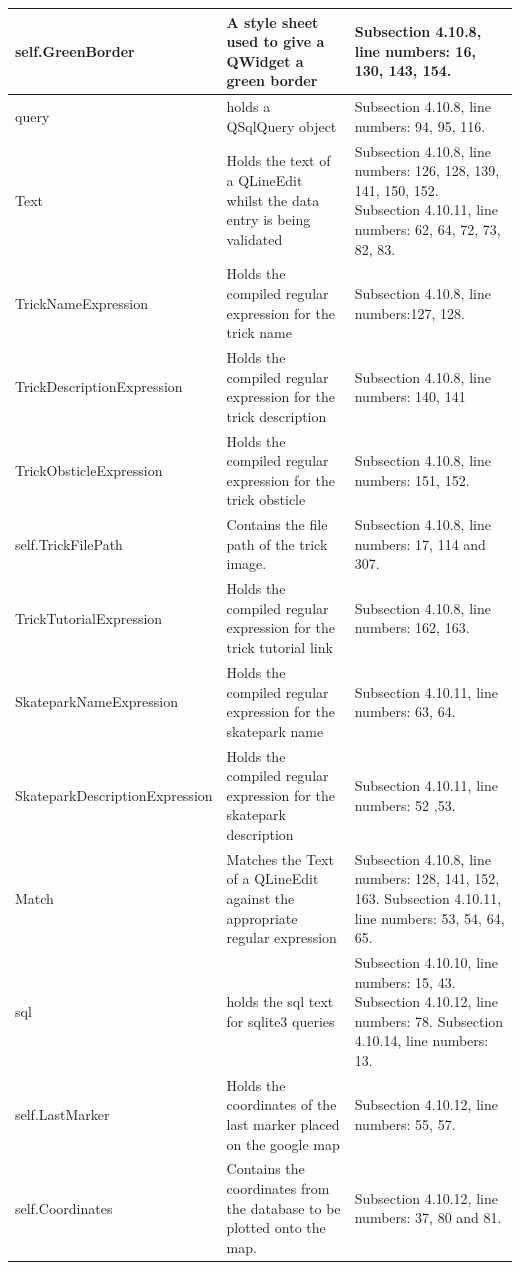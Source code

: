 \begin{center}
\begin{longtable}{|p{5cm}|p{6cm}|p{3.5cm}|}
self.GreenBorder & A style sheet used to give a QWidget a green border & Subsection 4.10.8, line numbers: 16, 130, 143, 154. \\ \hline
query & holds a QSqlQuery object & Subsection 4.10.8, line numbers: 94, 95, 116. \\ \hline
Text & Holds the text of a QLineEdit whilst the data entry is being validated &Subsection 4.10.8, line numbers: 126, 128, 139, 141, 150, 152. Subsection 4.10.11, line numbers: 62, 64, 72, 73, 82, 83. \\ \hline
TrickNameExpression & Holds the compiled regular expression for the trick name & Subsection 4.10.8, line numbers:127, 128. \\ \hline
TrickDescriptionExpression & Holds the compiled regular expression for the trick description & Subsection 4.10.8, line numbers: 140, 141 \\ \hline
TrickObsticleExpression & Holds the compiled regular expression for the trick obsticle &Subsection 4.10.8, line numbers: 151, 152. \\ \hline

self.TrickFilePath & Contains the file path of the trick image. & Subsection 4.10.8, line numbers: 17, 114 and 307. \\ \hline

TrickTutorialExpression & Holds the compiled regular expression for the trick tutorial link & Subsection 4.10.8, line numbers: 162, 163. \\ \hline
SkateparkNameExpression & Holds the compiled regular expression for the skatepark name& Subsection 4.10.11, line numbers: 63, 64. \\ \hline
SkateparkDescriptionExpression & Holds the compiled regular expression for the skatepark description & Subsection 4.10.11, line numbers: 52 ,53. \\ \hline
Match & Matches the Text of a QLineEdit against the appropriate regular expression & Subsection 4.10.8, line numbers: 128, 141, 152, 163. Subsection 4.10.11, line numbers: 53, 54, 64, 65. \\ \hline
sql & holds the sql text for sqlite3 queries & Subsection 4.10.10, line numbers: 15, 43. Subsection 4.10.12, line numbers: 78. Subsection 4.10.14, line numbers: 13. \\ \hline
self.LastMarker & Holds the coordinates of the last marker placed on the google map & Subsection 4.10.12, line numbers: 55, 57. \\ \hline


self.Coordinates & Contains the coordinates from the database to be plotted onto the map. & Subsection 4.10.12, line numbers: 37, 80 and 81. \\ \hline


\end{longtable}
\end{center}
